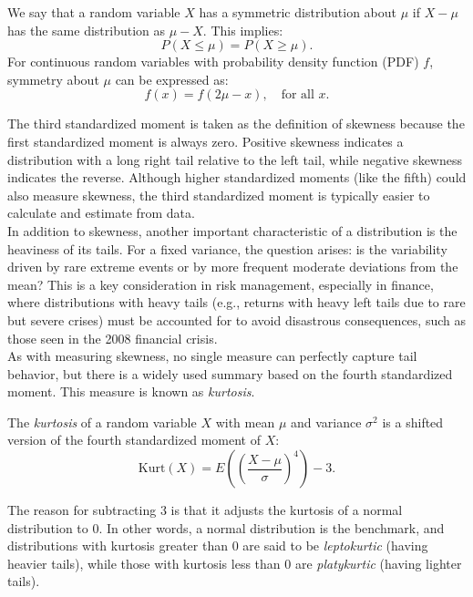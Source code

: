\begin{definition}
    We say that a random variable \( X \) has a symmetric distribution about \( \mu \) if \( X - \mu \) has the same distribution as \( \mu - X \). This implies:
\[
P(X \leq \mu) = P(X \geq \mu).
\]
For continuous random variables with probability density function (PDF) \( f \), symmetry about \( \mu \) can be expressed as:
\[
f(x) = f(2\mu - x), \quad \text{for all } x.
\]
\end{definition}

The third standardized moment is taken as the definition of skewness because the first standardized moment is always zero. Positive skewness indicates a distribution with a long right tail relative to the left tail, while negative skewness indicates the reverse. Although higher standardized moments (like the fifth) could also measure skewness, the third standardized moment is typically easier to calculate and estimate from data.\\

In addition to skewness, another important characteristic of a distribution is the heaviness of its tails. For a fixed variance, the question arises: is the variability driven by rare extreme events or by more frequent moderate deviations from the mean? This is a key consideration in risk management, especially in finance, where distributions with heavy tails (e.g., returns with heavy left tails due to rare but severe crises) must be accounted for to avoid disastrous consequences, such as those seen in the 2008 financial crisis.\\

As with measuring skewness, no single measure can perfectly capture tail behavior, but there is a widely used summary based on the fourth standardized moment. This measure is known as \textit{kurtosis}.

\begin{definition}
    The \textit{kurtosis} of a random variable \( X \) with mean \( \mu \) and variance \( \sigma^2 \) is a shifted version of the fourth standardized moment of \( X \):
\[
\text{Kurt}(X) = E\left( \left( \frac{X - \mu}{\sigma} \right)^4 \right) - 3.
\]
\end{definition}

The reason for subtracting 3 is that it adjusts the kurtosis of a normal distribution to 0. In other words, a normal distribution is the benchmark, and distributions with kurtosis greater than 0 are said to be \textit{leptokurtic} (having heavier tails), while those with kurtosis less than 0 are \textit{platykurtic} (having lighter tails).

